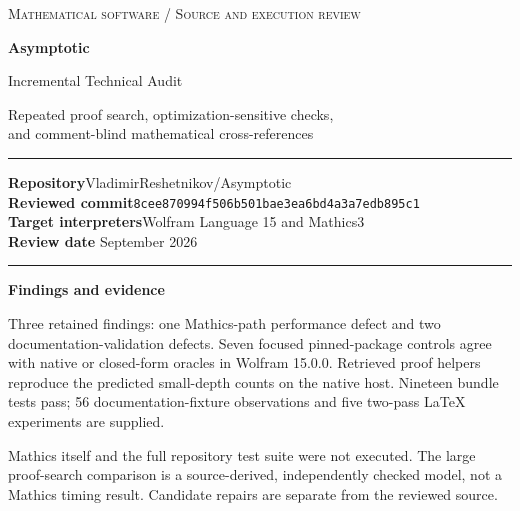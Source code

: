 \documentclass[11pt,letterpaper]{article}
\newcommand{\pin}{\texttt{8cee870994f506b501bae3ea6bd4a3a7edb895c1}}
\begin{document}
\begin{titlepage}
\vspace*{0.45in}
{\large\scshape\textcolor{ink}{Mathematical software / Source and execution review}\par}
\vspace{0.45in}
{\Huge\bfseries\textcolor{ink}{Asymptotic}\par}
\vspace{0.16in}
{\LARGE Incremental Technical Audit\par}
\vspace{0.35in}
{\Large Repeated proof search, optimization-sensitive checks,\\[4pt]
and comment-blind mathematical cross-references\par}
\vspace{0.45in}
\hrule\vspace{0.18in}
\textbf{Repository}\quad VladimirReshetnikov/Asymptotic\\[8pt]
\textbf{Reviewed commit}\quad\pin\\[8pt]
\textbf{Target interpreters}\quad Wolfram Language 15 and Mathics3\\[8pt]
\textbf{Review date} September 2026
\vspace{0.18in}\hrule
\vfill
\textbf{Findings and evidence}

Three retained findings: one Mathics-path performance defect and two documentation-validation defects. Seven focused pinned-package controls agree with native or closed-form oracles in Wolfram 15.0.0. Retrieved proof helpers reproduce the predicted small-depth counts on the native host. Nineteen bundle tests pass; 56 documentation-fixture observations and five two-pass LaTeX experiments are supplied.

\vspace{0.15in}
\small Mathics itself and the full repository test suite were not executed. The large proof-search comparison is a source-derived, independently checked model, not a Mathics timing result. Candidate repairs are separate from the reviewed source.
\end{titlepage}
\end{document}
